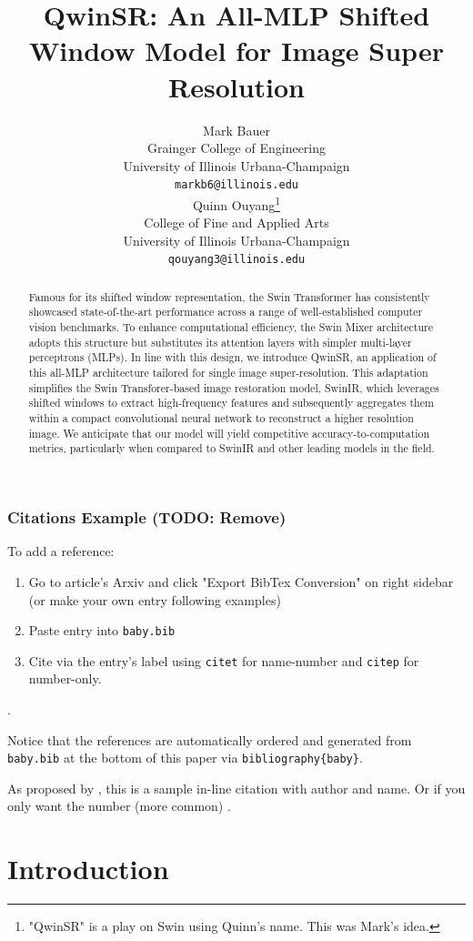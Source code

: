 \documentclass{article}
\title{QwinSR: An All-MLP Shifted Window Model for Image Super Resolution}
\author{
  Mark Bauer \\
  Grainger College of Engineering\\
  University of Illinois Urbana-Champaign\\
  \texttt{markb6@illinois.edu} \\
  \And
  Quinn Ouyang\thanks{"QwinSR" is a play on Swin using Quinn's name. This was Mark's idea.} \\
  College of Fine and Applied Arts \\
  University of Illinois Urbana-Champaign \\
  \texttt{qouyang3@illinois.edu} \\
}
\begin{document}
\maketitle

\begin{abstract}
    Famous for its shifted window representation, the Swin Transformer has consistently showcased state-of-the-art performance across a range of well-established computer vision benchmarks. To enhance computational efficiency, the Swin Mixer architecture adopts this structure but substitutes its attention layers with simpler multi-layer perceptrons (MLPs). In line with this design, we introduce QwinSR, an application of this all-MLP architecture tailored for single image super-resolution. This adaptation simplifies the Swin Transforer-based image restoration model, SwinIR, which leverages shifted windows to extract high-frequency features and subsequently aggregates them within a compact convolutional neural network to reconstruct a higher resolution image. We anticipate that our model will yield competitive accuracy-to-computation metrics, particularly when compared to SwinIR and other leading models in the field.
\end{abstract}

\subsubsection*{Citations Example (TODO: Remove)}

To add a reference:

\begin{enumerate}
    \item Go to article's Arxiv and click "Export BibTex Conversion" on right sidebar (or make your own entry following examples)
    \item Paste entry into \texttt{baby.bib}
    \item Cite via the entry's label using \texttt{citet} for name-number and \texttt{citep} for number-only.
\end{enumerate}.

Notice that the references are automatically ordered and generated from \texttt{baby.bib} at the bottom of this paper via \texttt{bibliography\{baby\}}.

As proposed by \citet{liang2021swinir}, this is a sample in-line citation with author and name. Or if you only want the number (more common) \citep{knuthwebsite}.

\section{Introduction}
\end{document}
